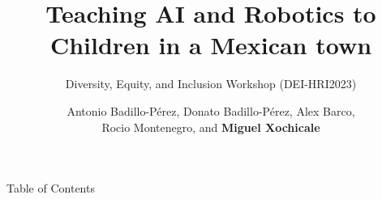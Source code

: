 \documentclass[xcolor={dvipsnames},aspectratio=169,10pt]{beamer}
\title{
Teaching AI and Robotics to Children in a Mexican town
}
\subtitle{
Diversity, Equity, and Inclusion Workshop (DEI-HRI2023) 
}
\author{
Antonio Badillo-P\'erez,
Donato Badillo-P\'erez, 
Alex Barco, \\ 
Rocio Montenegro, and
{\bf Miguel Xochicale}
}
\date{
}
\institute{
	\faEnvelope \space  air4children@gmail.com \\
	\faGithubAlt \space @air4children \faTwitter \space @air4children  
		}
\begin{document}
\maketitle

\begin{frame}{Table of Contents}
    \tableofcontents
\end{frame}








\maketitle
\end{document}
